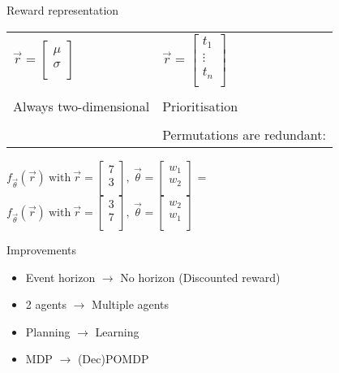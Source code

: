 \documentclass{beamer}
\begin{document}
\begin{frame}{Reward representation}

	\begin{tabular*}{\linewidth}{l|l}
	$\vec{r} = \begin{bmatrix}
		\mu\\
		\sigma\\
	\end{bmatrix}$ &
	$\vec{r} = \begin{bmatrix}
		t_1\\
		\vdots\\
		t_n\\
	\end{bmatrix}$\\
										& \\
		Always two-dimensional	& Prioritisation\\
										& \\
										& Permutations are redundant:\\
	\end{tabular*}
	\vspace{1cm}

	$f_{\vec{\theta}}(\vec{r})~\textrm{with}~\vec{r} = \begin{bmatrix}
		7\\
		3\\
	\end{bmatrix},~
	\vec{\theta} = \begin{bmatrix}
		w_1\\
		w_2\\
	\end{bmatrix}$
	=\\
	$ f_{\vec{\theta}}(\vec{r})~\textrm{with}~\vec{r} = \begin{bmatrix}
		3\\
		7\\
	\end{bmatrix},~
	\vec{\theta} = \begin{bmatrix}
		w_2\\
		w_1\\
	\end{bmatrix}$
\end{frame}

\begin{frame}{Improvements}
	\begin{itemize}
		\item Event horizon $\rightarrow$ No horizon (Discounted reward)
		\item 2 agents $\rightarrow$ Multiple agents
		\item	Planning $\rightarrow$ Learning
		\item MDP $\rightarrow$ (Dec)POMDP
	\end{itemize}

\end{frame}

	
	
\end{document}
